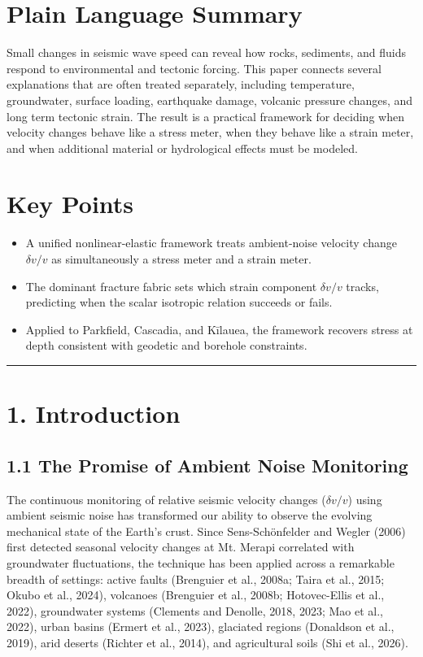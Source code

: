 \documentclass[draft]{agujournal2019}
\providecommand{\tightlist}{%
  \setlength{\itemsep}{0pt}\setlength{\parskip}{0pt}}
\begin{document}
\section*{Plain Language Summary}
Small changes in seismic wave speed can reveal how rocks, sediments, and
fluids respond to environmental and tectonic forcing. This paper
connects several explanations that are often treated separately,
including temperature, groundwater, surface loading, earthquake damage,
volcanic pressure changes, and long term tectonic strain. The result is
a practical framework for deciding when velocity changes behave like a
stress meter, when they behave like a strain meter, and when additional
material or hydrological effects must be modeled.

\section{Key Points}\label{key-points}

\begin{itemize}
\tightlist
\item
  A unified nonlinear-elastic framework treats ambient-noise velocity
  change \(\delta v/v\) as simultaneously a stress meter and a strain
  meter.
\item
  The dominant fracture fabric sets which strain component
  \(\delta v/v\) tracks, predicting when the scalar isotropic relation
  succeeds or fails.
\item
  Applied to Parkfield, Cascadia, and Kīlauea, the framework recovers
  stress at depth consistent with geodetic and borehole constraints.
\end{itemize}

\begin{center}\rule{0.5\linewidth}{0.5pt}\end{center}

\section{1. Introduction}\label{introduction}

\subsection{1.1 The Promise of Ambient Noise
Monitoring}\label{the-promise-of-ambient-noise-monitoring}

The continuous monitoring of relative seismic velocity changes
(\(\delta v/v\)) using ambient seismic noise has transformed our ability
to observe the evolving mechanical state of the Earth's crust. Since
Sens-Schönfelder and Wegler (2006) first detected seasonal velocity
changes at Mt. Merapi correlated with groundwater fluctuations, the
technique has been applied across a remarkable breadth of settings:
active faults (Brenguier et al., 2008a; Taira et al., 2015; Okubo et
al., 2024), volcanoes (Brenguier et al., 2008b; Hotovec-Ellis et al.,
2022), groundwater systems (Clements and Denolle, 2018, 2023; Mao et
al., 2022), urban basins (Ermert et al., 2023), glaciated regions
(Donaldson et al., 2019), arid deserts (Richter et al., 2014), and
agricultural soils (Shi et al., 2026).
\end{document}
